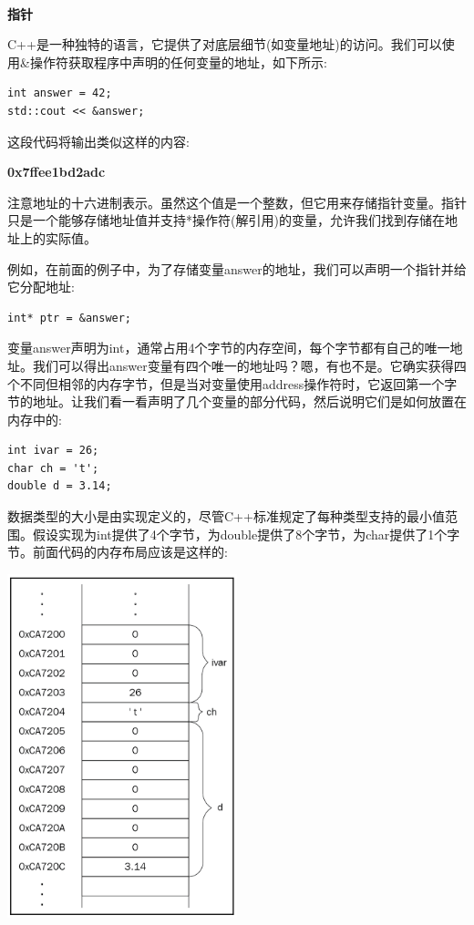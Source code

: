 \noindent\textbf{}\ \par
\textbf{指针} \ \par
C++是一种独特的语言，它提供了对底层细节(如变量地址)的访问。我们可以使用\&操作符获取程序中声明的任何变量的地址，如下所示:\par

\begin{lstlisting}[caption={}]
int answer = 42;
std::cout << &answer;
\end{lstlisting}

这段代码将输出类似这样的内容: \par

	\textbf{0x7ffee1bd2adc} \par
	
注意地址的十六进制表示。虽然这个值是一个整数，但它用来存储指针变量。指针只是一个能够存储地址值并支持*操作符(解引用)的变量，允许我们找到存储在地址上的实际值。 \par
例如，在前面的例子中，为了存储变量answer的地址，我们可以声明一个指针并给它分配地址: \par

\begin{lstlisting}[caption={}]
int* ptr = &answer;
\end{lstlisting}

变量answer声明为int，通常占用4个字节的内存空间，每个字节都有自己的唯一地址。我们可以得出answer变量有四个唯一的地址吗？嗯，有也不是。它确实获得四个不同但相邻的内存字节，但是当对变量使用address操作符时，它返回第一个字节的地址。让我们看一看声明了几个变量的部分代码，然后说明它们是如何放置在内存中的: \par

\begin{lstlisting}[caption={}]
int ivar = 26;
char ch = 't';
double d = 3.14;
\end{lstlisting}

数据类型的大小是由实现定义的，尽管C++标准规定了每种类型支持的最小值范围。假设实现为int提供了4个字节，为double提供了8个字节，为char提供了1个字节。前面代码的内存布局应该是这样的:\par

\begin{center}
	\includegraphics[width=0.5\textwidth]{content/Section-1/Chapter-2/9}
\end{center}

